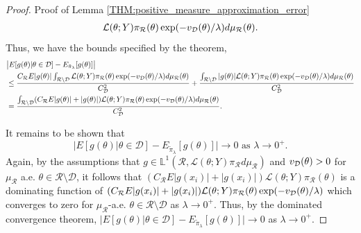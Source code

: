 \documentclass[10pt,fleqn]{article} \pdfoutput=1
\DeclareMathOperator{\1}{\mathbbm{1}} \DeclareMathOperator{\bigO}{\mc O}
\begin{document}
\begin{proof}{Proof of
		Lemma \ref{THM:positive_measure_approximation_error}}
\begin{align*}
		\mathcal{L}(\theta;Y)\pi_\mathcal{R}(\theta)\exp(-v_{\mathcal{D}}(\theta)/\lambda )
		d\mu_\mathcal{R}(\theta).\end{align*} Thus, we have the bounds specified
	by the theorem, \begin{align*}  & \big|
		E[g(\theta)|\theta\in\mathcal{D}]-E_{\tilde{\pi}_\lambda}[g(\theta)]\big|
		\\ & \le \frac{C_\mathcal{R}E|g(\theta)| \int_{\mathcal{R}\setminus
				\mathcal{D}}
			\mathcal{L}(\theta;Y)\pi_\mathcal{R}(\theta)\exp(-v_{\mathcal{D}}(\theta)/\lambda )
			d\mu_\mathcal{R}(\theta)}{C_\mathcal{D}^2 } +
		\frac{\int_{\mathcal{R}\setminus \mathcal{D}} |g(\theta)|
			\mathcal{L}(\theta;Y)\pi_\mathcal{R}(\theta)\exp(-v_{\mathcal{D}}(\theta)/\lambda )
			d\mu_\mathcal{R}(\theta)}{C_\mathcal{D}^2 } \\ &=
		\frac{\int_{\mathcal{R}\setminus \mathcal{D}}
		(C_\mathcal{R}E|g(\theta)|+|g(\theta)|)
		\mathcal{L}(\theta;Y)\pi_\mathcal{R}(\theta)\exp(-v_{\mathcal{D}}(\theta)/\lambda )
		d\mu_\mathcal{R}(\theta)}{C_\mathcal{D}^2 }.\end{align*}

	It remains to be shown that $$\big|
		E[g(\theta)|\theta\in\mathcal{D}]-E_{\tilde{\pi}_\lambda}[g(\theta)]\big|
		\to 0 \text{ as }\lambda\to0^+.$$ Again, by the assumptions that
	$g\in\mathbb{L}^1(\mathcal{R},\mathcal{L}(\theta;Y)\pi_\mathcal{R}d\mu_\mathcal{R})$
	and $v_{\mathcal{D}}(\theta) >0$ for $\mu_\mathcal{R}$ a.e.  $\theta \in
		\mathcal{R}\setminus \mathcal{D}$, it follows that
	$(C_\mathcal{R}E|g(x_i)|+|g(x_i)|)
		\mathcal{L}(\theta;Y)\pi_\mathcal{R}(\theta)$ is a dominating function of
	$(C_\mathcal{R}E|g(x_i)|+|g(x_i)|)
		\mathcal{L}(\theta;Y)\pi_\mathcal{R}(\theta)\exp(-v_{\mathcal{D}}(\theta)/\lambda )$
	which converges to zero for $\mu_\mathcal{R}$-a.e.
	$\theta\in\mathcal{R}\setminus\mathcal{D}$ as $\lambda\to 0^+.$ Thus, by
	the dominated convergence theorem, $\big|
		E[g(\theta)|\theta\in\mathcal{D}]-E_{\tilde{\pi}_\lambda}[g(\theta)]\big|\to
		0$ as $\lambda\to0^+.$

\end{proof}
\end{document}
